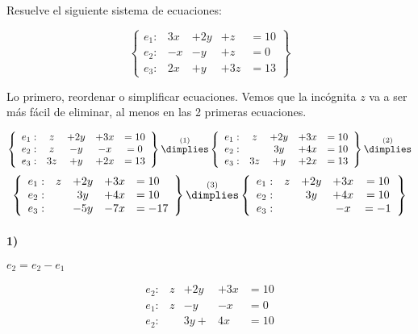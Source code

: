 \documentclass[palatino,nosec]{Docencia}
\begin{document}
\newpage
\begin{problem}
Resuelve el siguiente sistema de ecuaciones:

\[
\left\{\begin{array}{lllll}
e_1: & 3x &+ 2y &+z &=10\\
e_2: & -x&-y&+z&=0\\
e_3: & 2x&+y&+3z&=13
\end{array}\right\}
\]

\solution

Lo primero, reordenar o simplificar ecuaciones. Vemos que la incógnita $z$ va a ser más fácil de eliminar, al menos en las 2 primeras ecuaciones. 

\[
\left\{\begin{array}{lcccc}
e_1: & z &+ 2y &+3x &=10\\
e_2: & z&-y&-x&=0\\
e_3: & 3z&+y&+2x&=13
\end{array}\right\} 
\overset{(1)}{\dimplies}
\left\{\begin{array}{lccccc}
e_1: & z &+ 2y &+3x &=10\\
e_2: & &3y&+4x&=10\\
e_3: &3z&+y&+2x&=13
\end{array}\right\}
\overset{(2)}{\dimplies}\]
\[
\left\{\begin{array}{lcccl}
e_1: & z&+ 2y&+3x &=10\\
e_2: & &3y&+4x&=10\\
e_3: & &-5y&-7x&=-17\\
\end{array}\right\}
\overset{(3)}{\dimplies}
\left\{\begin{array}{lccccc}
e_1: & z&+ 2y&+3x &=10\\
e_2: & &3y&+4x&=10\\
e_3: &&&-x&=-1\\
\end{array}\right\}
\]


\paragraph{1)}
$e_2 = e_2-e_1$

\[
\begin{array}{rcccl}
e_2: & z &+ 2y &+3x &=10\\
e_1: & z&-y&-x&=0\\
\hline
e_2: & &3y+&4x&=10\\
\end{array}
\]	


\end{problem}
\end{document}
